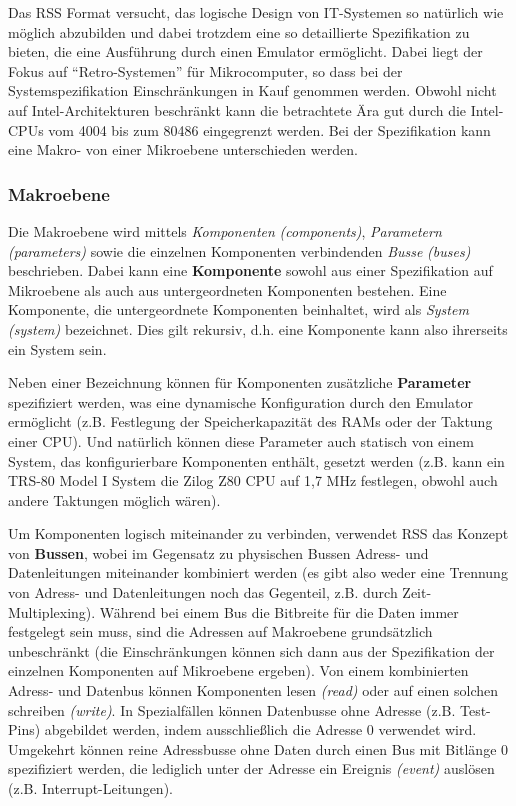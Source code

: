 \documentclass{scrartcl}
\begin{document}
\vspace{10pt}
\noindent Das RSS Format versucht, das logische Design von IT-Systemen so natürlich wie möglich abzubilden und dabei trotzdem eine so detaillierte Spezifikation zu bieten, die eine Ausführung durch einen Emulator ermöglicht. Dabei liegt der Fokus auf ``Retro-Systemen'' für Mikrocomputer, so dass bei der Systemspezifikation Einschränkungen in Kauf genommen werden. Obwohl nicht auf Intel-Architekturen beschränkt kann die betrachtete Ära gut durch die Intel-CPUs vom 4004 bis zum 80486 eingegrenzt werden. Bei der Spezifikation kann eine Makro- von einer Mikroebene unterschieden werden.

\subsubsection{Makroebene}

\noindent Die Makroebene wird mittels \textit{Komponenten} \textit{(components)}, \textit{Parametern} \textit{(parameters)} sowie die einzelnen Komponenten verbindenden \textit{Busse} \textit{(buses)} beschrieben. Dabei kann eine \textbf{Komponente} sowohl aus einer Spezifikation auf Mikroebene als auch aus untergeordneten Komponenten bestehen. Eine Komponente, die untergeordnete Komponenten beinhaltet, wird als \textit{System} \textit{(system)} bezeichnet. Dies gilt rekursiv, d.h. eine Komponente kann also ihrerseits ein System sein.

\vspace{10pt}
\noindent Neben einer Bezeichnung können für Komponenten zusätzliche \textbf{Parameter} spezifiziert werden, was eine dynamische Konfiguration durch den Emulator ermöglicht (z.B. Festlegung der Speicherkapazität des RAMs oder der Taktung einer CPU). Und natürlich können diese Parameter auch statisch von einem System, das konfigurierbare Komponenten enthält, gesetzt werden (z.B. kann ein TRS-80 Model I System die Zilog Z80 CPU auf 1,7 MHz festlegen, obwohl auch andere Taktungen möglich wären).

\vspace{10pt}
\noindent Um Komponenten logisch miteinander zu verbinden, verwendet RSS das Konzept von \textbf{Bussen}, wobei im Gegensatz zu physischen Bussen Adress- und Datenleitungen miteinander kombiniert werden (es gibt also weder eine Trennung von Adress- und Datenleitungen noch das Gegenteil, z.B. durch Zeit-Multiplexing). Während bei einem Bus die Bitbreite für die Daten immer festgelegt sein muss, sind die Adressen auf Makroebene grundsätzlich unbeschränkt (die Einschränkungen können sich dann aus der Spezifikation der einzelnen Komponenten auf Mikroebene ergeben). Von einem kombinierten Adress- und Datenbus können Komponenten lesen \textit{(read)} oder auf einen solchen schreiben \textit{(write)}. In Spezialfällen können Datenbusse ohne Adresse (z.B. Test-Pins) abgebildet werden, indem ausschließlich die Adresse 0 verwendet wird. Umgekehrt können reine Adressbusse ohne Daten durch einen Bus mit Bitlänge 0 spezifiziert werden, die lediglich unter der Adresse ein Ereignis \textit{(event)} auslösen (z.B. Interrupt-Leitungen).
\end{document}
